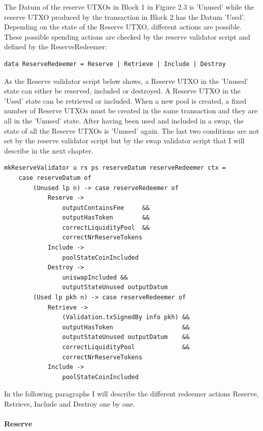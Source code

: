 \documentclass[a4paper,twoside,12pt]{report}
\begin{document}
The Datum of the reserve UTXOs in Block 1 in Figure 2.3 is 'Unused' while the reserve UTXO produced by the transaction in Block 2 has the Datum 'Used'. Depending on the state of the Reserve UTXO, different actions are possible. These possible spending actions are checked by the reserve validator script and defined by the ReserveRedeemer:

\begin{verbatim}
data ReserveRedeemer = Reserve | Retrieve | Include | Destroy
\end{verbatim}

As the Reserve validator script below shows, a Reserve UTXO in the 'Unused' state can either be reserved, included or destroyed. A Reserve UTXO in the 'Used' state can be retrieved or included. When a new pool is created, a fixed number of Reserve UTXOs must be created in the same transaction and they are all in the 'Unused' state. After having been used and included in a swap, the state of all the Reserve UTXOs is 'Unused' again. The last two conditions are not set by the reserve validator script but by the swap validator script that I will describe in the next chapter.

\begin{verbatim}
mkReserveValidator u rs ps reserveDatum reserveRedeemer ctx =
    case reserveDatum of
        (Unused lp n) -> case reserveRedeemer of
            Reserve ->
                outputContainsFee     &&
                outputHasToken        &&
                correctLiquidityPool  &&
                correctNrReserveTokens
            Include ->
                poolStateCoinIncluded
            Destroy -> 
                uniswapIncluded &&
                outputStateUnused outputDatum
        (Used lp pkh n) -> case reserveRedeemer of
            Retrieve ->
                (Validation.txSignedBy info pkh) &&
                outputHasToken                   &&
                outputStateUnused outputDatum    &&
                correctLiquidityPool             &&
                correctNrReserveTokens
            Include ->
                poolStateCoinIncluded
\end{verbatim}

In the following paragraphs I will describe the different redeemer actions Reserve, Retrieve, Include and Destroy one by one.

\paragraph{Reserve}
\end{document}
